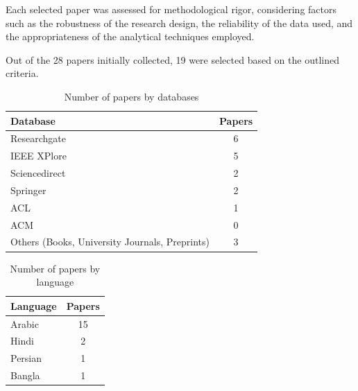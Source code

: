 \documentclass{article}
\begin{document}
Each selected paper was assessed for methodological rigor, considering factors such as the robustness of the research design, the reliability of the data used, and the appropriateness of the analytical techniques employed. 

Out of the 28 papers initially collected, 19 were selected based on the outlined criteria.

	\renewcommand{\arraystretch}{1.5}
	\begin{table}[]
		\centering
		\begin{tabular}{p{3in}  c}
			\hline
			\textbf{Database} & \textbf{Papers} \\ \hline
			Researchgate & 6 \\
			IEEE XPlore & 5 \\
			Sciencedirect & 2 \\
			Springer & 2 \\
			ACL & 1 \\ 
			ACM & 0 \\
			Others (Books, University Journals, Preprints) & 3 \\
			\hline
		\end{tabular}
		\caption*{Number of papers by databases}
		\label{papersbydb}
	\end{table}
	\begin{table}[]
		\centering
		\begin{tabular}{p{2in} c}
			\hline
			\textbf{Language} & \textbf{Papers} \\ \hline
			Arabic & 15 \\
			Hindi & 2 \\
			Persian & 1 \\
			Bangla & 1 \\
			\hline
		\end{tabular}
		\caption*{Number of papers by language}
		
		\label{tab:my_label}
	\end{table}
	
	
	

\end{document}
